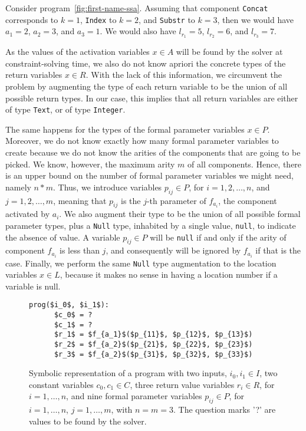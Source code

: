 \begin{example}
  Consider program~\ref{fig:first-name-ssa}.
  Assuming that component \lstinline{Concat} corresponds to $k = 1$,
  \lstinline{Index} to $k = 2$, and \lstinline{Substr} to $k = 3$, then we would
  have $a_1 = 2 $, $a_2 = 3$, and $a_3 = 1$.
  We would also have $l_{r_1} = 5$, $l_{r_2} = 6$, and $l_{r_3} = 7$.
\end{example}

As the values of the activation variables $x \in A$ will be found by the solver
at constraint-solving time, we also do not know apriori the concrete types of
the return variables $x \in R$.
With the lack of this information, we circumvent the problem by augmenting the
type of each return variable to be the union of all possible return types. In
our case, this implies that all return variables are either of type
\lstinline{Text}, or of type \lstinline{Integer}.

The same happens for the types of the formal parameter variables $x \in P$.
Moreover, we do not know exactly how many formal parameter variables to create
because we do not know the arities of the components that are going to be picked.
We know, however, the maximum arity $m$ of all components.
Hence, there is an upper bound on the number of formal parameter variables we
might need, namely $n * m$.
Thus, we introduce variables $p_{ij} \in P$, for $i = 1, 2, \ldots, n$, and
$j = 1, 2, \ldots, m$, meaning that $p_{ij}$ is the $j$-th
parameter of $f_{a_i}$, the component activated by $a_i$.
We also augment their type to be the union of all possible formal parameter
types, plus a \lstinline{Null} type, inhabited by a single value,
\lstinline{null}, to indicate the absence of value.
A variable $p_{ij} \in P$ will be \lstinline{null} if and only if the arity of
component $f_{a_i}$ is less than $j$, and consequently will be ignored by
$f_{a_i}$ if that is the case.
Finally, we perform the same \lstinline{Null} type augmentation to the location
variables $x \in L$, because it makes no sense in having a location number if a
variable is null.

\begin{figure}
  \begin{lstlisting}[frame=tlrb,mathescape=true]
    prog($i_0$, $i_1$):
      $c_0$ = ?
      $c_1$ = ?
      $r_1$ = $f_{a_1}$($p_{11}$, $p_{12}$, $p_{13}$)
      $r_2$ = $f_{a_2}$($p_{21}$, $p_{22}$, $p_{23}$)
      $r_3$ = $f_{a_2}$($p_{31}$, $p_{32}$, $p_{33}$)
  \end{lstlisting}
\caption{Symbolic representation of a program with two inputs, $i_0, i_1 \in I$,
  two constant variables $c_0, c_1 \in C$, three return value variables $r_i \in
  R$, for $i = 1, \ldots, n$, and nine formal parameter variables $p_{ij} \in
  P$, for $i = 1, \ldots, n$, $j = 1, \ldots, m$, with $n = m = 3$.
  The question marks '?' are values to be found by the solver.}
\label{fig:whole-encoding-prog}
\end{figure}

